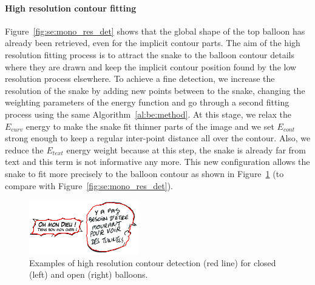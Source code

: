 \paragraph{High resolution contour fitting}
Figure~\ref{fig:se:mono_res_det} shows that the global shape of the top balloon has already been retrieved, even for the implicit contour parts.
The aim of the high resolution fitting process is to attract the snake to the balloon contour details where they are drawn and keep the implicit contour position found by the low resolution process elsewhere.
To achieve a fine detection, we increase the resolution of the snake by adding new points between to the snake, changing the weighting parameters of the energy function and go through a second fitting process using the same Algorithm~\ref{al:be:method}.
At this stage, we relax the $E_{curv}$ energy to make the snake fit thinner parts of the image and we set $E_{cont}$ strong enough to keep a regular inter-point distance all over the contour.
Also, we reduce the $E_{text}$ energy weight because at this step, the snake is already far from text and this term is not informative any more.
This new configuration allows the snake to fit more precisely to the balloon contour as shown in Figure~\ref{fig:se:hd_contour} (to compare with Figure~\ref{fig:se:mono_res_det}).


	\begin{figure}[!ht]	%
	  \centering
		\includegraphics[trim = 0mm 2mm 0mm 1mm, clip, width=180px]{multi_res_det.png}
		\caption[Examples of high resolution contour detection for balloon extraction]{Examples of high resolution contour detection (red line) for closed (left) and open (right) balloons.}
		\label{fig:se:hd_contour}
	\end{figure}

